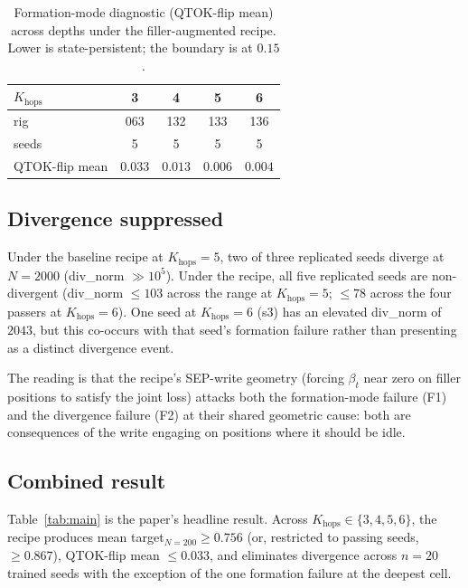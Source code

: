 \documentclass[11pt]{article}
\begin{document}
\begin{table}[h]
\centering
\small
\caption{Formation-mode diagnostic (QTOK-flip mean) across depths
under the filler-augmented recipe. Lower is state-persistent; the
boundary is at $0.15$.}
\label{tab:formation}
\begin{tabular}{lcccc}
\toprule
$K_{\mathrm{hops}}$ & 3 & 4 & 5 & 6 \\
\midrule
rig            & 063 & 132 & 133 & 136 \\
seeds          & 5   & 5   & 5   & 5   \\
QTOK-flip mean & $0.033$ & $0.013$ & $0.006$ & $0.004$ \\
\bottomrule
\end{tabular}
\end{table}

\subsection{Divergence suppressed}
\label{sec:divergence}

Under the baseline recipe at $K_{\mathrm{hops}} = 5$, two of three
replicated seeds diverge at $N = 2000$
(div\_norm $\gg 10^5$). Under the recipe, all five replicated
seeds are non-divergent (div\_norm $\le 103$ across the range at
$K_{\mathrm{hops}} = 5$; $\le 78$ across the four passers at
$K_{\mathrm{hops}} = 6$). One seed at $K_{\mathrm{hops}} = 6$
(s3) has an elevated div\_norm of $2043$, but this co-occurs with
that seed's formation failure rather than presenting as a distinct
divergence event.

The reading is that the recipe's SEP-write geometry (forcing
$\beta_t$ near zero on filler positions to satisfy the joint loss)
attacks both the formation-mode failure (F1) and the divergence
failure (F2) at their shared geometric cause: both are
consequences of the write engaging on positions where it should be
idle.

\subsection{Combined result}
\label{sec:combined}

Table~\ref{tab:main} is the paper's headline result. Across
$K_{\mathrm{hops}} \in \{3, 4, 5, 6\}$, the recipe produces mean
target$_{N=200} \ge 0.756$ (or, restricted to passing seeds,
$\ge 0.867$), QTOK-flip mean $\le 0.033$, and eliminates divergence
across $n = 20$ trained seeds with the exception of the one formation
failure at the deepest cell.
\end{document}
